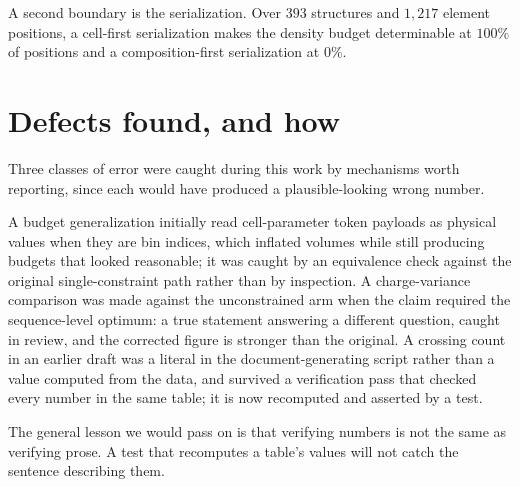 A second boundary is the serialization. Over $393$ structures and $1{,}217$ element
positions, a cell-first serialization makes the density budget determinable at $100\%$
of positions and a composition-first serialization at $0\%$.

\section{Defects found, and how}
\label{si:defects}

Three classes of error were caught during this work by mechanisms worth reporting, since
each would have produced a plausible-looking wrong number.

A budget generalization initially read cell-parameter token payloads as physical values
when they are bin indices, which inflated volumes while still producing budgets that
looked reasonable; it was caught by an equivalence check against the original
single-constraint path rather than by inspection. A charge-variance comparison was made
against the unconstrained arm when the claim required the sequence-level optimum:
a true statement answering a different question, caught in review, and the corrected
figure is stronger than the original. A crossing count in an earlier draft was a literal
in the document-generating script rather than a value computed from the data, and
survived a verification pass that checked every number in the same table; it is now
recomputed and asserted by a test.

The general lesson we would pass on is that verifying numbers is not the same as
verifying prose. A test that recomputes a table's values will not catch the sentence
describing them.
